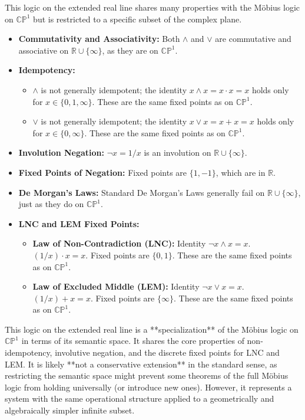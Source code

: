 	This logic on the extended real line shares many properties with the M\"{o}bius logic on $\mathbb{CP}^1$ but is restricted to a specific subset of the complex plane.
	
	\begin{itemize}
		\item \textbf{Commutativity and Associativity:} Both $\wedge$ and $\vee$ are commutative and associative on $\mathbb{R} \cup \{\infty\}$, as they are on $\mathbb{CP}^1$.
		\item \textbf{Idempotency:}
		\begin{itemize}
			\item \(\wedge\) is not generally idempotent; the identity \(x \wedge x = x \cdot x = x\) holds only for \(x \in \{0, 1, \infty\}\). These are the same fixed points as on $\mathbb{CP}^1$.
			\item \(\vee\) is not generally idempotent; the identity \(x \vee x = x + x = x\) holds only for \(x \in \{0, \infty\}\). These are the same fixed points as on $\mathbb{CP}^1$.
		\end{itemize}
		\item \textbf{Involution Negation:} $\neg x = 1/x$ is an involution on $\mathbb{R} \cup \{\infty\}$.
		\item \textbf{Fixed Points of Negation:} Fixed points are $\{1, -1\}$, which are in $\mathbb{R}$.
		\item \textbf{De Morgan's Laws:} Standard De Morgan's Laws generally fail on $\mathbb{R} \cup \{\infty\}$, just as they do on $\mathbb{CP}^1$.
		\item \textbf{LNC and LEM Fixed Points:}
		\begin{itemize}
			\item \textbf{Law of Non-Contradiction (LNC):} Identity \(\neg x \wedge x = x\). \((1/x) \cdot x = x\). Fixed points are $\{0, 1\}$. These are the same fixed points as on $\mathbb{CP}^1$.
			\item \textbf{Law of Excluded Middle (LEM):} Identity \(\neg x \vee x = x\). \((1/x) + x = x\). Fixed points are $\{\infty\}$. These are the same fixed points as on $\mathbb{CP}^1$.
		\end{itemize}
	\end{itemize}
	
	This logic on the extended real line is a **specialization** of the M\"{o}bius logic on $\mathbb{CP}^1$ in terms of its semantic space. It shares the core properties of non-idempotency, involutive negation, and the discrete fixed points for LNC and LEM. It is likely **not a conservative extension** in the standard sense, as restricting the semantic space might prevent some theorems of the full M\"{o}bius logic from holding universally (or introduce new ones). However, it represents a system with the same operational structure applied to a geometrically and algebraically simpler infinite subset.
	
